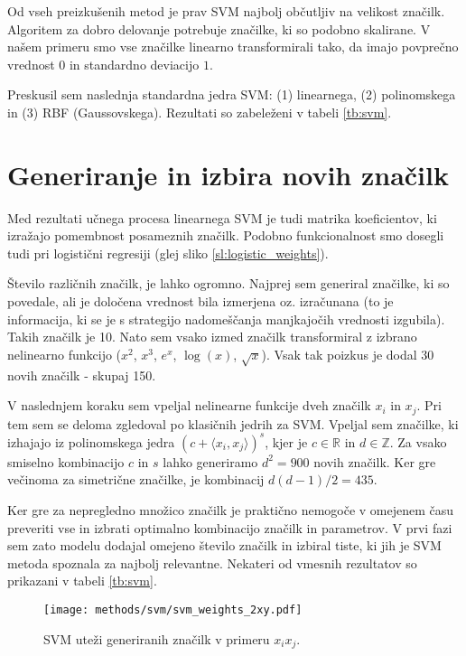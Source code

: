 \documentclass[11pt,a4paper,openany]{book}
\begin{document}
Od vseh preizkušenih metod je prav SVM najbolj občutljiv na velikost značilk. Algoritem za dobro delovanje potrebuje značilke, ki so podobno skalirane. V našem primeru smo vse značilke linearno transformirali tako, da imajo povprečno vrednost $0$ in standardno deviacijo $1$.

Preskusil sem naslednja standardna jedra SVM: (1) linearnega, (2) polinomskega in (3) RBF (Gaussovskega). Rezultati so zabeleženi v tabeli \ref{tb:svm}.

\section{Generiranje in izbira novih značilk}
Med rezultati učnega procesa linearnega SVM je tudi matrika koeficientov, ki izražajo pomembnost posameznih značilk. Podobno funkcionalnost smo dosegli tudi pri logistični regresiji (glej sliko \ref{sl:logistic_weights}).

Število različnih značilk, je lahko ogromno. Najprej sem generiral značilke, ki so povedale, ali je določena vrednost bila izmerjena oz. izračunana (to je informacija, ki se je s strategijo nadomeščanja manjkajočih vrednosti izgubila). Takih značilk je 10. Nato sem vsako izmed značilk transformiral z izbrano nelinearno funkcijo ($x^2$, $x^3$, $e^{x}$, $\log(x)$, $\sqrt{x}$). Vsak tak poizkus je dodal 30 novih značilk - skupaj 150.

V naslednjem koraku sem vpeljal nelinearne funkcije dveh značilk $x_i$ in $x_j$. Pri tem sem se deloma zgledoval po klasičnih jedrih za SVM. Vpeljal sem značilke, ki izhajajo iz polinomskega jedra $(c + \langle x_i,x_j\rangle)^s$, kjer je $c \in \mathbb{R}$ in $d \in \mathbb{Z}$. Za vsako smiselno kombinacijo $c$ in $s$ lahko generiramo $d^2 = 900$ novih značilk. Ker gre večinoma za simetrične značilke, je kombinacij $d(d-1)/2 = 435$.

Ker gre za nepregledno množico značilk je praktično nemogoče v omejenem času preveriti vse in izbrati optimalno kombinacijo značilk in parametrov. V prvi fazi sem zato modelu dodajal omejeno število značilk in izbiral tiste, ki jih je SVM metoda spoznala za najbolj relevantne. Nekateri od vmesnih rezultatov so prikazani v tabeli \ref{tb:svm}.

\begin{figure}[h]
	\centering	
	\texttt{[image: methods/svm/svm\_weights\_2xy.pdf]}
	
	\caption{SVM uteži generiranih značilk v primeru $x_ix_j$.}
	\label{sl:svm_xy_weights}
\end{figure}
\end{document}

